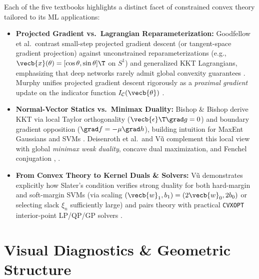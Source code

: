 \documentclass[../../../../master.tex]{subfiles}
\begin{document}
\begin{crossbook}
\label{cb:convex:perspectives}
Each of the five textbooks highlights a distinct facet of constrained convex theory tailored to its ML applications:
\begin{itemize}[leftmargin=1.4em]
  \item \textbf{Projected Gradient vs.\ Lagrangian Reparameterization:} Goodfellow et al.\ contrast small-step projected gradient descent (or tangent-space gradient projection) against unconstrained reparameterizations (e.g., $\vecb{x}(\theta) = [\cos\theta, \sin\theta]\T$ on $S^1$) and generalized KKT Lagrangians, emphasizing that deep networks rarely admit global convexity guarantees . Murphy unifies projected gradient descent rigorously as a \emph{proximal gradient} update on the indicator function $I_{\mathcal{C}}(\vecb{\theta})$ .
  \item \textbf{Normal-Vector Statics vs.\ Minimax Duality:} Bishop \& Bishop derive KKT via local Taylor orthogonality ($\vecb{\epsilon}\T\grad g = 0$) and boundary gradient opposition ($\grad f = -\mu\grad h$), building intuition for MaxEnt Gaussians and SVMs . Deisenroth et al.\ and V\~{u} complement this local view with global \emph{minimax weak duality}, concave dual maximization, and Fenchel conjugation , .
  \item \textbf{From Convex Theory to Kernel Duals \& Solvers:} V\~{u} demonstrates explicitly how Slater's condition verifies strong duality for both hard-margin and soft-margin SVMs (via scaling $(\vecb{w}_1, b_1) = (2\vecb{w}_0, 2b_0)$ or selecting slack $\xi_n$ sufficiently large) and pairs theory with practical \texttt{CVXOPT} interior-point LP/QP/GP solvers .
\end{itemize}
\end{crossbook}

\section{Visual Diagnostics \& Geometric Structure}
\label{sec:convex:visuals}
\end{document}
